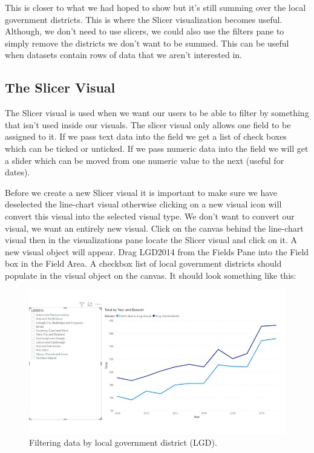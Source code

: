 \documentclass[
]{book}
\begin{document}
This is closer to what we had hoped to show but it's still summing over the local government districts. This is where the Slicer visualization becomes useful. Although, we don't need to use slicers, we could also use the filters pane to simply remove the districts we don't want to be summed. This can be useful when datasets contain rows of data that we aren't interested in.

\hypertarget{the-slicer-visual}{%
\subsection{The Slicer Visual}\label{the-slicer-visual}}

The Slicer visual is used when we want our users to be able to filter by something that isn't used inside our visuals. The slicer visual only allows one field to be assigned to it. If we pass text data into the field we get a list of check boxes which can be ticked or unticked. If we pass numeric data into the field we will get a slider which can be moved from one numeric value to the next (useful for dates).

Before we create a new Slicer visual it is important to make sure we have deselected the line-chart visual otherwise clicking on a new visual icon will convert this visual into the selected visual type. We don't want to convert our visual, we want an entirely new visual. Click on the canvas behind the line-chart visual then in the visualizations pane locate the Slicer visual and click on it. A new visual object will appear. Drag LGD2014 from the Fields Pane into the Field box in the Field Area. A checkbox list of local government districts should populate in the visual object on the canvas. It should look something like this:

\begin{figure}
\centering
\includegraphics{bi8.jpg}
\caption{Filtering data by local government district (LGD).}
\end{figure}
\end{document}
